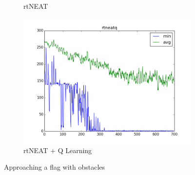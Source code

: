 \documentclass[letterpaper]{article}
\begin{document}
\begin{figure}[ht]
\begin{subfigure}{0.7\columnwidth}
  \caption{rtNEAT}
  \label{fig:wall_neat}
\end{subfigure}
\begin{subfigure}{0.7\columnwidth}
  \centering
  \includegraphics[width=\columnwidth]{wall_rtneatq.png}
  \caption{rtNEAT + Q Learning}
  \label{fig:wall_neatq}
\end{subfigure}
\caption{Approaching a flag with obstacles}
\label{fig:wall}
\end{figure}
\end{document}
